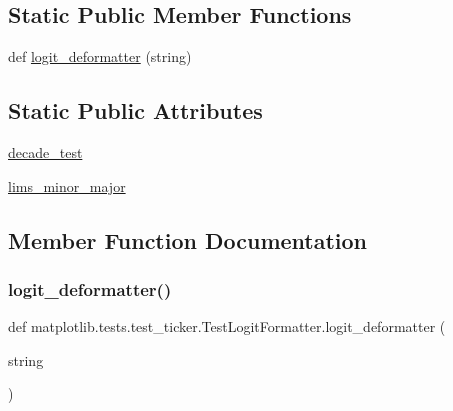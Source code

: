 \subsection*{Static Public Member Functions}
\begin{DoxyCompactItemize}
\item 
def \hyperlink{classmatplotlib_1_1tests_1_1test__ticker_1_1TestLogitFormatter_a698d580178ecf78739112a578b3a128d}{logit\+\_\+deformatter} (string)
\end{DoxyCompactItemize}
\subsection*{Static Public Attributes}
\begin{DoxyCompactItemize}
\item 
\hyperlink{classmatplotlib_1_1tests_1_1test__ticker_1_1TestLogitFormatter_ad8978c8d17b764c3d0f05da4a663630c}{decade\+\_\+test}
\item 
\hyperlink{classmatplotlib_1_1tests_1_1test__ticker_1_1TestLogitFormatter_a0015e20595ab4b9dd3ac88b625d5e4e3}{lims\+\_\+minor\+\_\+major}
\end{DoxyCompactItemize}


\subsection{Member Function Documentation}
\mbox{\label{classmatplotlib_1_1tests_1_1test__ticker_1_1TestLogitFormatter_a698d580178ecf78739112a578b3a128d}} 
\subsubsection{\texorpdfstring{logit\+\_\+deformatter()}{logit\_deformatter()}}
{\footnotesize\ttfamily def matplotlib.\+tests.\+test\+\_\+ticker.\+Test\+Logit\+Formatter.\+logit\+\_\+deformatter (\begin{DoxyParamCaption}\item[{}]{string }\end{DoxyParamCaption})\hspace{0.3cm}{\ttfamily [static]}}

